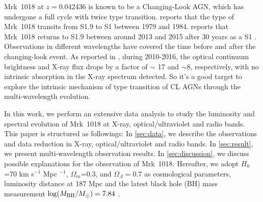 \documentclass[twocolumn]{aastex63}
\begin{document}
Mrk~1018 at $z=0.042436$ is known to be a Changing-Look AGN, which has undergone a full cycle with twice type transition. \citet{1986ApJ...311..135C} reports that the type of Mrk~1018 transits from S1.9 to S1 between 1979 and 1984. \citet{2016A&A...593L...8M} reports that Mrk~1018 returns to S1.9 between around 2013 and 2015 after 30 years as a S1 \citep[see also][]{2017A&A...607L...9K}. %
Observations in different wavelengths have covered the time before and after the changing-look event. %
As reported in \citet{2016A&A...593L...9H}, during 2010-2016, the optical continuum brightness and X-ray flux drops by a factor of $\sim$ 17 and $\sim 8$, respectively, with no intrinsic absorption in the X-ray spectrum detected. So it's a good target to explore the intrinsic mechanism of type transition of CL AGNs through the multi-wavelength evolution.


In this work, we perform an extensive data analysis to study the luminosity and spectral evolution of Mrk~1018 at X-ray, optical/ultraviolet and radio bands. This paper is structured as followings: In \autoref{sec:data}, we describe the observations and data reduction in X-ray, optical/ultraviolet and radio bands. In \autoref{sec:result}, we present multi-wavelength observation results. In \autoref{sec:discussion}, we discuss possible explanations for the observation of Mrk~1018. Hereafter, we adopt $H_0$=70 km s$^{-1}$ Mpc $^{-1}$, $\Omega_{m}$=0.3, and $\Omega_{\Lambda}=0.7 $ as cosmological parameters, luminosity distance at 187 Mpc and the latest black hole (BH) mass measurement $\log(M_{\rm{BH}}/M_{\odot})=7.84$ \citep{2017MNRAS.472.3492E,2018MNRAS.480.3898N}. 
\end{document}
